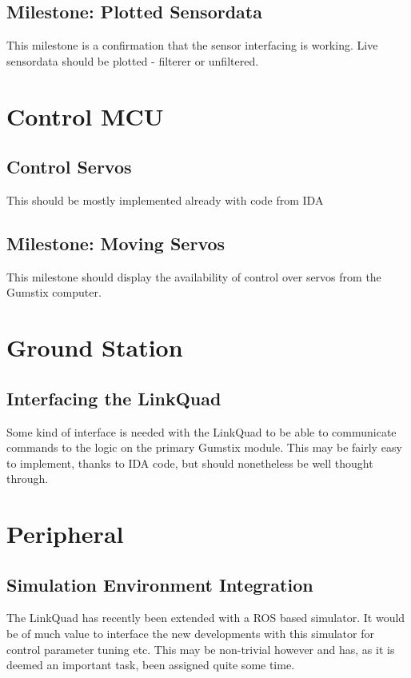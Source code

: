     \subsection{Milestone: Plotted Sensordata}
        This milestone is a confirmation that the sensor interfacing is working.
        Live sensordata should be plotted - filterer or unfiltered.

\section{Control MCU}
    \subsection{Control Servos}
        This should be mostly implemented already with code from IDA
    \subsection{Milestone: Moving Servos}
        This milestone should display the availability of control over servos from the Gumstix
        computer.

\section{Ground Station}
    \subsection{Interfacing the LinkQuad}
        Some kind of interface is needed with the LinkQuad to be able to communicate
        commands to the logic on the primary Gumstix module.
        This may be fairly easy to implement, thanks to IDA code, but should
        nonetheless be well thought through.

\section{Peripheral}
    \subsection{Simulation Environment Integration}
        The LinkQuad has recently been extended with a ROS based simulator.
        It would be of much value to interface the new developments with
        this simulator for control parameter tuning etc. This may be non-trivial however
        and has, as it is deemed an important task, been assigned quite some time.

